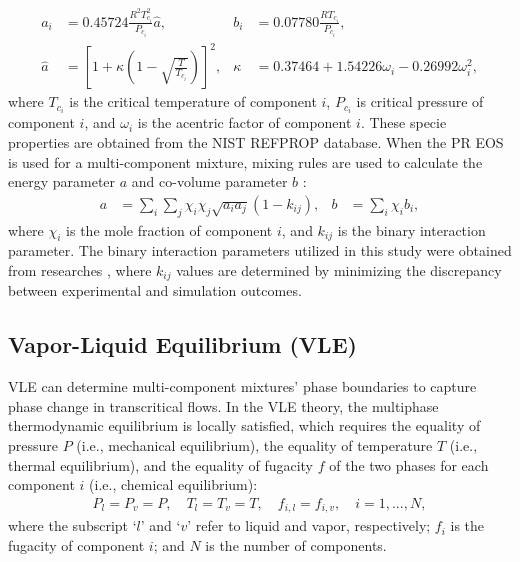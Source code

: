\begin{align}
	a_i     & = 0.45724\frac{R^2 T_{c_i}^2}{P_{c_i}} \hat{a} ,                 & b_i    & =0.07780\frac{RT_{c_i}}{P_{c_i}} \label{eq:ab}, \\
	\hat{a} & =\left[1+\kappa\left(1-\sqrt{\frac{T}{T_{c_i}}}\right)\right]^2, & \kappa & =0.37464+1.54226\omega_i-0.26992\omega_i^2,
\end{align}
where $T_{c_i}$ is the critical temperature of component $i$, $P_{c_i}$ is critical pressure of component $i$, and $\omega_i$ is the acentric factor of component $i$. These specie properties are obtained from the NIST REFPROP database. When the PR EOS is used for a multi-component mixture, mixing rules are used to calculate the energy parameter $a$ and co-volume parameter $b$ \cite{reid1977properties}:
\begin{align}
	a & =\sum_i\sum_j\chi_i\chi_j\sqrt{a_ia_j}(1-k_{ij}), & b & =\sum_i\chi_i b_i,\label{eq:mix}
\end{align}
where $\chi_i$ is the mole fraction of component $i$, and $k_{ij}$ is the binary interaction parameter. The binary interaction parameters utilized in this study were obtained from researches \cite{eliosa2009vapor,garcia2011vapor}, where $k_{ij}$ values are determined by minimizing the discrepancy between experimental and simulation outcomes.

\subsection{Vapor-Liquid Equilibrium (VLE)}
VLE can determine multi-component mixtures' phase boundaries to capture phase change in transcritical flows. In the VLE theory, the multiphase thermodynamic equilibrium is locally satisfied, which requires the equality of pressure $P$ (i.e., mechanical equilibrium), the equality of temperature $T$ (i.e., thermal equilibrium), and the equality of fugacity $f$ of the two phases for each component $i$ (i.e., chemical equilibrium):
\begin{align}
	P_l=P_v=P,\quad T_l=T_v=T,\quad f_{i,l}=f_{i,v},\quad i=1,...,N, \label{eq:eq}
\end{align}
where the subscript `$l$' and `$v$' refer to liquid and vapor, respectively; $f_i$ is the fugacity of component $i$; and $N$ is the number of components.

